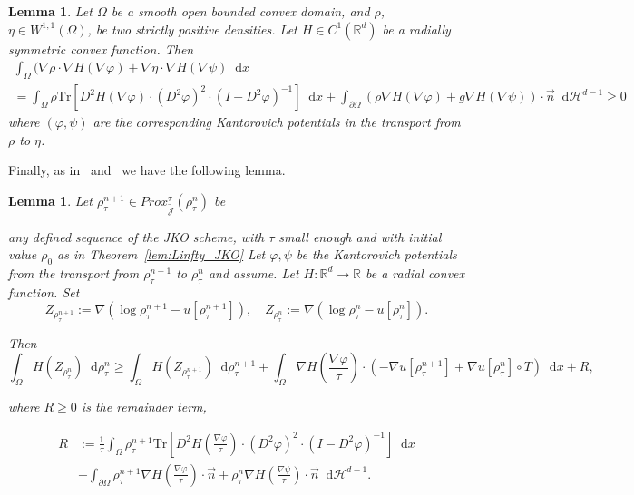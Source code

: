 \documentclass[a4paper,twosided, 11pt]{article}
\renewcommand{\color}[2][]{}
\newcommand{\R}{\mathbb{R}}
\newcommand {\f}   {\frac}
\newcommand {\p}   {\partial}
\theoremstyle{plain}
\newtheorem{lemma}[thm]{Lemma}
\theoremstyle{remark}
\newcommand{\diff}{\mathop{}\!\mathrm{d}}
\numberwithin{equation}{section}
\begin{document}
\begin{lemma}\label{lem:five_gradients_inequality}
Let $\Omega$ be a smooth open bounded convex domain, and $\rho$, $\eta\in W^{1,1}(\Omega)$, be two strictly positive densities. Let $H\in C^{1}(\R^d)$ be a radially symmetric convex function. Then 
 \begin{multline*}
 \int_{\Omega}( \nabla \rho \cdot \nabla H(\nabla \varphi)+\nabla \eta\cdot \nabla H(\nabla \psi) \diff x\\= \int_{\Omega}\rho \mathrm{Tr}[D^2H(\nabla\varphi)\cdot (D^2\varphi)^2 \cdot(I-D^2\varphi)^{-1}]\diff x+ \int_{\partial\Omega}\left(\rho\nabla H(\nabla\varphi) + g \nabla H(\nabla \psi)\right)\cdot \vec{n} \diff \mathcal{H}^{d-1}\geq 0
 \end{multline*}
 where $(\varphi,\psi)$ are the corresponding Kantorovich potentials in the transport from $\rho$ to $\eta$.
\end{lemma}

Finally, as in~\cite[Lemma 5.1]{dimarino} and~\cite[Proposition 5.2]{toshpulatov} we have the following lemma.

\begin{lemma}\label{lem:consequence_five_gradients}
Let $\rho^{n+1}_{\tau}\in Prox_{\widetilde{\mathcal{J}}}^{\tau}(\rho^{n}_{\tau})$ be {\color{blue} any defined sequence of the JKO scheme, with $\tau$ small enough and with initial value $\rho_{0}$ as in Theorem~\ref{lem:Linfty_JKO} Let $\varphi,\psi$ be the Kantorovich potentials from the transport from $\rho^{n+1}_{\tau}$ to $\rho^{n}_{\tau}$ and assume.  Let $H:\R^d\to \R$ be a radial convex function. Set
$$
Z_{\rho^{n+1}_{\tau}} := \nabla (\log \rho^{n+1}_{\tau} -u[\rho^{n+1}_{\tau}]), \quad Z_{\rho^{n}_{\tau}} := \nabla(\log \rho^{n}_{\tau} - u[\rho^{n}_{\tau}]). 
$$

Then 
$$
\int_{\Omega}H(Z_{\rho^{n}_{\tau}})\diff\rho^{n}_{\tau} \ge \int_{\Omega}H(Z_{\rho^{n+1}_{\tau}})\diff\rho^{n+1}_{\tau} + \int_{\Omega}\nabla H\left(\f{\nabla\varphi}{\tau}\right)\cdot \left(-\nabla u[\rho^{n+1}_{\tau}] + \nabla u[\rho^{n}_{\tau}]\circ T\right)\diff x + R, 
$$

where $R\ge 0$ is the remainder term, 

\begin{align*}
R &:= \f{1}{\tau}\int_{\Omega}\rho^{n+1}_{\tau} \mathrm{Tr}[D^2H\left(\f{\nabla\varphi}{\tau}\right)\cdot (D^2\varphi)^2 \cdot(I-D^2\varphi)^{-1}]\diff x\\
&+\int_{\p\Omega}\rho^{n+1}_{\tau}\nabla H \left(\f{\nabla\varphi}{\tau}\right)\cdot \vec{n} +  \rho^{n}_{\tau} \nabla H \left(\f{\nabla\psi}{\tau}\right)\cdot\vec{n}\diff  \mathcal{H}^{d-1}. 
\end{align*}}
\end{lemma}
\end{document}
